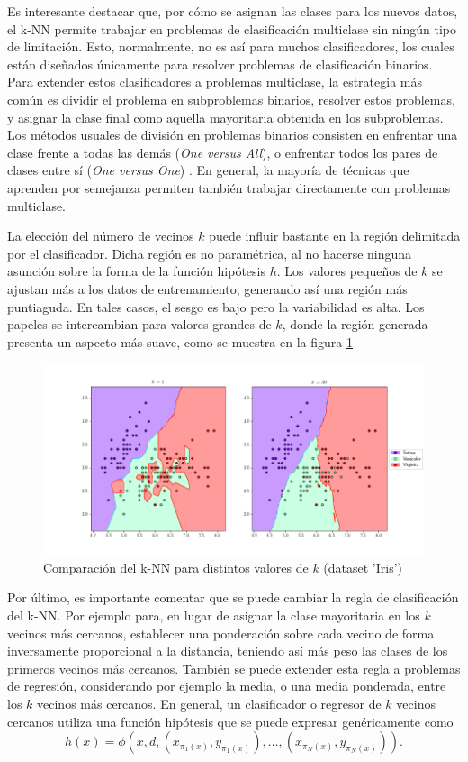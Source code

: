 Es interesante destacar que, por cómo se asignan las clases para los nuevos datos, el k-NN permite trabajar en problemas de clasificación multiclase sin ningún tipo de limitación. Esto, normalmente, no es así para muchos clasificadores, los cuales están diseñados únicamente para resolver problemas de clasificación binarios. Para extender estos clasificadores a problemas multiclase, la estrategia más común es dividir el problema en subproblemas binarios, resolver estos problemas, y asignar la clase final como aquella mayoritaria obtenida en los subproblemas. Los métodos usuales de división en problemas binarios consisten en enfrentar una clase frente a todas las demás (\emph{One versus All}), o enfrentar todos los pares de clases entre sí (\emph{One versus One}) \cite{ovoova}. En general, la mayoría de técnicas que aprenden por semejanza permiten también trabajar directamente con problemas multiclase.

La elección del número de vecinos $k$ puede influir bastante en la región delimitada por el clasificador. Dicha región es no paramétrica, al no hacerse ninguna asunción sobre la forma de la función hipótesis $h$. Los valores pequeños de $k$  se ajustan más a los datos de entrenamiento, generando así una región más puntiaguda. En tales casos, el sesgo es bajo pero la variabilidad es alta. Los papeles se intercambian para valores grandes de $k$, donde la región generada presenta un aspecto más suave, como se muestra en la figura \ref{fig:knn_comp_k}

\begin{figure}[h]
    \centering
    \includegraphics[width=\textwidth]{./images/compare_knn.png}
    \caption{Comparación del k-NN para distintos valores de $k$ (dataset 'Iris')} \label{fig:knn_comp_k}
\end{figure}

Por último, es importante comentar que se puede cambiar la regla de clasificación del k-NN. Por ejemplo para, en lugar de asignar la clase mayoritaria en los $k$ vecinos más cercanos, establecer una ponderación sobre cada vecino de forma inversamente proporcional a la distancia, teniendo así más peso las clases de los primeros vecinos más cercanos. También se puede extender esta regla a problemas de regresión, considerando por ejemplo la media, o una media ponderada, entre los $k$ vecinos más cercanos. En general, un clasificador o regresor de $k$ vecinos cercanos utiliza una función hipótesis que se puede expresar genéricamente como
\[ h(x) = \phi(x,d,(x_{\pi_1(x)},y_{\pi_1(x)}),\dots,(x_{\pi_N(x)},y_{\pi_N(x)})). \]

